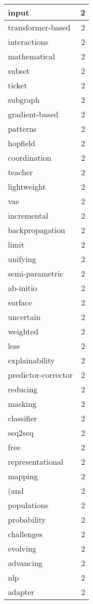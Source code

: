 \begin{table}[h]
\begin{tabular}{|l|r|}
\hline
input & 2 \\
\hline
transformer-based & 2 \\
\hline
interactions & 2 \\
\hline
mathematical & 2 \\
\hline
subset & 2 \\
\hline
ticket & 2 \\
\hline
subgraph & 2 \\
\hline
gradient-based & 2 \\
\hline
patterns & 2 \\
\hline
hopfield & 2 \\
\hline
coordination & 2 \\
\hline
teacher & 2 \\
\hline
lightweight & 2 \\
\hline
vae & 2 \\
\hline
incremental & 2 \\
\hline
backpropagation & 2 \\
\hline
limit & 2 \\
\hline
unifying & 2 \\
\hline
semi-parametric & 2 \\
\hline
ab-initio & 2 \\
\hline
surface & 2 \\
\hline
uncertain & 2 \\
\hline
weighted & 2 \\
\hline
less & 2 \\
\hline
explainability & 2 \\
\hline
predictor-corrector & 2 \\
\hline
reducing & 2 \\
\hline
masking & 2 \\
\hline
classifier & 2 \\
\hline
seq2seq & 2 \\
\hline
free & 2 \\
\hline
representational & 2 \\
\hline
mapping & 2 \\
\hline
(and & 2 \\
\hline
populations & 2 \\
\hline
probability & 2 \\
\hline
challenges & 2 \\
\hline
evolving & 2 \\
\hline
advancing & 2 \\
\hline
nlp & 2 \\
\hline
adapter & 2 \\

\end{tabular}
\end{table}
